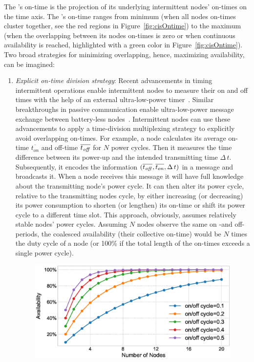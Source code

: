 The \sys's on-time is the projection of its underlying intermittent nodes' on-times on the time axis. The \sys's on-time ranges from minimum (when all nodes on-times cluster together, see the red regions in Figure~\ref{fig:cisOntime}) to the maximum (when the overlapping between its nodes on-times is zero or when continuous availability is reached, highlighted with a green color in Figure~\ref{fig:cisOntime}). Two broad strategies for minimizing overlapping, hence, maximizing \sys availability, can be imagined: 
\begin{enumerate}[label=\roman*.]%
%
		\item \textit{Explicit on-time division strategy}: Recent advancements in timing intermittent operations enable intermittent nodes to measure their on and off times with the help of an external ultra-low-power timer~\cite{hester2017timely}. Similar breakthroughs in passive communication enable ultra-low-power message exchange between battery-less nodes~\cite{li2015retro}. Intermittent nodes can use these advancements to apply a time-division multiplexing strategy to explicitly avoid overlapping on-times. For example, a node calculates its average on-time $\overline{t_{on}}$ and off-time $\overline{t_{\it off}}$ for $N$ power cycles. Then it measures the time difference between its power-up and the intended transmitting time $\Delta\,t$. Subsequently, it encodes the information $({\overline{t_{\it off}}, \overline{t_{on}}, \Delta\,t})$ in a message and broadcasts it. When a node receives this message it will have full knowledge about the transmitting node's power cycle. It can then alter its power cycle, relative to the transmitting nodes cycle, by either increasing (or decreasing) its power consumption to shorten (or lengthen) its on-time or shift its power cycle to a different time slot. This approach, obviously, assumes relatively stable nodes' power cycles. Assuming $N$ nodes observe the same on -and off- periods, the coalesced availability (their collective on-time) would be $N$ times the duty cycle of a node (or 100\% if the total length of the on-times exceeds a single power cycle).
%
\begin{figure}
		\centering
		\includegraphics[width=\columnwidth]{figures/cisModel}

\end{figure}
\end{enumerate}

